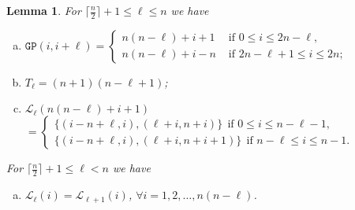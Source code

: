 \documentclass[journal,draftcls,onecolumn,12pt,twoside]{IEEEtran}
\newtheorem{lemma}[theorem]{\bf Lemma}
\newcommand{\GP}{{\mathtt{GP}}}
\renewcommand{\d}{\displaystyle}
\begin{document}
\begin{lemma}\label{lemma:GP_largelength}
For $\lceil\frac{n}{2}\rceil+1 \leq\ell\leq n$ we have
\begin{enumerate}[(a)]
\item $\d \GP(i,i+\ell) = 
	\begin{cases}
	n(n-\ell)+i+1 & \text{ if } 0\leq i\leq 2n-\ell, \\
	n(n-\ell)+i-n & \text{ if } 2n-\ell+1 \leq i \leq 2n;
	\end{cases}$
\smallskip
\item $T_{\ell}=(n+1)(n-\ell+1)$;
\smallskip
\item $\mathcal{L}_{\ell}(n(n-\ell)+i+1)$ \\ 
$\d= 
	\begin{cases}
	\{(i-n+\ell, i), (\ell+i,n+i)\} ~~\text{if } 0\leq i\leq n-\ell-1, \\
	\{(i-n+\ell, i), (\ell+i,n+i+1)\} ~~\text{if } n-\ell \leq i \leq n-1.
	\end{cases}$
\end{enumerate}
For $\lceil\frac{n}{2}\rceil+1 \leq\ell < n$ we have
\begin{enumerate}[(d)]
\item $\mathcal{L}_{\ell}(i) = \mathcal{L}_{\ell+1}(i)$, $\forall i=1,2,\ldots, n(n-\ell)$.
\end{enumerate}
\end{lemma}
\end{document}
